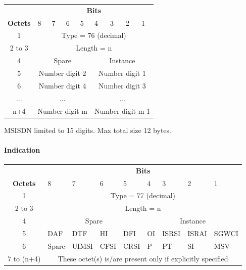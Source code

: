 \begin{tabular}{c|p{1cm}|p{1cm}|p{1cm}|p{1cm}|p{1cm}|p{1cm}|p{1cm}|p{1cm}|}
\multicolumn{1}{c}{} & \multicolumn{8}{c}{\textbf{Bits}} \\
\cline{2-9} \textbf{Octets} & 8 & 7 & 6 & 5 & 4 & 3 & 2 & 1 \\ 
\cline{2-9} 1 & \multicolumn{8}{c|}{Type = 76 (decimal)} \\ 
\cline{2-9} 2 to 3 & \multicolumn{8}{c|}{Length = n}  \\ 
\cline{2-9} 4 & \multicolumn{4}{c|}{Spare} & \multicolumn{4}{c|}{Instance} \\ 
\cline{2-9} 5 & \multicolumn{4}{c|}{Number digit 2} & \multicolumn{4}{c|}{Number digit 1} \\ 
\cline{2-9} 6 & \multicolumn{4}{c|}{Number digit 4} & \multicolumn{4}{c|}{Number digit 3} \\ 
\cline{2-9} ... & \multicolumn{4}{c|}{...} & \multicolumn{4}{c|}{...} \\ 
\cline{2-9} n+4 & \multicolumn{4}{c|}{Number digit m} & \multicolumn{4}{c|}{Number digit m-1} \\ 
\cline{2-9}
\end{tabular} 

MSISDN limited to 15 digits. Max total size 12 bytes.


\paragraph{Indication}
\centering
\begin{tabular}{c|p{1cm}|p{1cm}|p{1cm}|p{1cm}|p{1cm}|p{1cm}|p{1cm}|p{1cm}|}
\multicolumn{1}{c}{} & \multicolumn{8}{c}{\textbf{Bits}} \\
\cline{2-9} \textbf{Octets} & 8 & 7 & 6 & 5 & 4 & 3 & 2 & 1 \\ 
\cline{2-9} 1 & \multicolumn{8}{c|}{Type = 77 (decimal)} \\ 
\cline{2-9} 2 to 3 & \multicolumn{8}{c|}{Length = n}  \\ 
\cline{2-9} 4 & \multicolumn{4}{c|}{Spare} & \multicolumn{4}{c|}{Instance} \\ 
\cline{2-9} 5 & DAF & DTF & HI & DFI & OI & ISRSI & ISRAI & SGWCI \\ 
\cline{2-9} 6 & Spare & UIMSI & CFSI & CRSI & P & PT & SI & MSV \\ 
\cline{2-9} 7 to (n+4) & \multicolumn{8}{c|}{These octet(s) is/are present only if explicitly specified} \\ 
\cline{2-9}
\end{tabular} 

